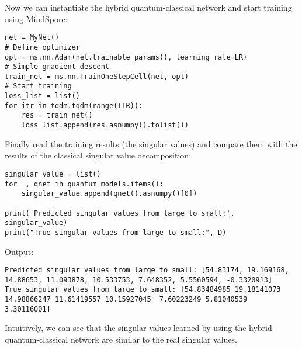 Now we can instantiate the hybrid quantum-classical network and start training using MindSpore: 
\begin{lstlisting}
net = MyNet()
# Define optimizer
opt = ms.nn.Adam(net.trainable_params(), learning_rate=LR)
# Simple gradient descent
train_net = ms.nn.TrainOneStepCell(net, opt)
# Start training
loss_list = list()
for itr in tqdm.tqdm(range(ITR)):
    res = train_net()
    loss_list.append(res.asnumpy().tolist())
\end{lstlisting}
Finally read the training results (the singular values) and compare them with the results of the classical singular value decomposition:
\begin{lstlisting}
singular_value = list()
for _, qnet in quantum_models.items():
    singular_value.append(qnet().asnumpy()[0])

print('Predicted singular values from large to small:', singular_value)
print("True singular values from large to small:", D)
\end{lstlisting}
Output:
\begin{lstlisting}
Predicted singular values from large to small: [54.83174, 19.169168, 14.88653, 11.093878, 10.533753, 7.648352, 5.5560594, -0.3320913]
True singular values from large to small: [54.83484985 19.18141073 14.98866247 11.61419557 10.15927045  7.60223249 5.81040539  3.30116001]
\end{lstlisting}
Intuitively, we can see that the singular values learned by using the hybrid quantum-classical network are similar to the real singular values. 
